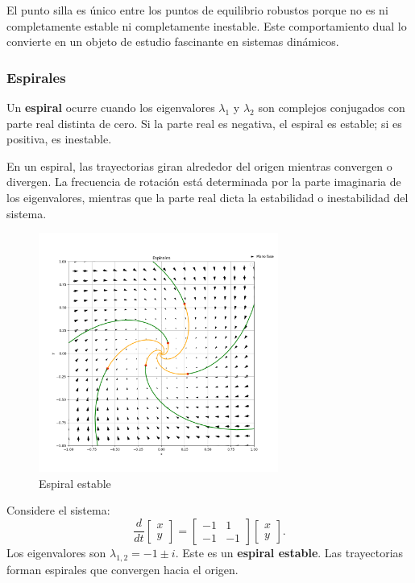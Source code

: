 El punto silla es único entre los puntos de equilibrio robustos porque no es ni completamente estable ni completamente inestable. Este comportamiento dual lo convierte en un objeto de estudio fascinante en sistemas dinámicos.

\subsubsection{Espirales}

\begin{definition}
Un \textbf{espiral} ocurre cuando los eigenvalores $\lambda_1$ y $\lambda_2$ son complejos conjugados con parte real distinta de cero. Si la parte real es negativa, el espiral es estable; si es positiva, es inestable.
\end{definition}

En un espiral, las trayectorias giran alrededor del origen mientras convergen o divergen. La frecuencia de rotación está determinada por la parte imaginaria de los eigenvalores, mientras que la parte real dicta la estabilidad o inestabilidad del sistema.

\begin{figure}[h]
    \centering
    \includegraphics[width=0.7\textwidth]{Img/Espirales.png}
    \caption{Espiral estable}
    \label{fig:espiral}
\end{figure}

\begin{example}
Considere el sistema:
\[
\frac{d}{dt} \begin{bmatrix} x \\ y \end{bmatrix} = \begin{bmatrix} -1 & 1 \\ -1 & -1 \end{bmatrix} \begin{bmatrix} x \\ y \end{bmatrix}.
\]
Los eigenvalores son $\lambda_{1,2} = -1 \pm i$. Este es un \textbf{espiral estable}. Las trayectorias forman espirales que convergen hacia el origen.
\end{example}

